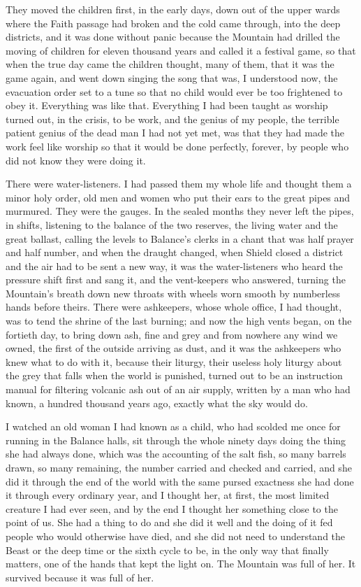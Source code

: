 They moved the children first, in the early days, down out of the upper wards where the Faith passage had broken and the cold came through, into the deep districts, and it was done without panic because the Mountain had drilled the moving of children for eleven thousand years and called it a festival game, so that when the true day came the children thought, many of them, that it was the game again, and went down singing the song that was, I understood now, the evacuation order set to a tune so that no child would ever be too frightened to obey it. Everything was like that. Everything I had been taught as worship turned out, in the crisis, to be work, and the genius of my people, the terrible patient genius of the dead man I had not yet met, was that they had made the work feel like worship so that it would be done perfectly, forever, by people who did not know they were doing it.\par

There were water-listeners. I had passed them my whole life and thought them a minor holy order, old men and women who put their ears to the great pipes and murmured. They were the gauges. In the sealed months they never left the pipes, in shifts, listening to the balance of the two reserves, the living water and the great ballast, calling the levels to Balance's clerks in a chant that was half prayer and half number, and when the draught changed, when Shield closed a district and the air had to be sent a new way, it was the water-listeners who heard the pressure shift first and sang it, and the vent-keepers who answered, turning the Mountain's breath down new throats with wheels worn smooth by numberless hands before theirs. There were ashkeepers, whose whole office, I had thought, was to tend the shrine of the last burning; and now the high vents began, on the fortieth day, to bring down ash, fine and grey and from nowhere any wind we owned, the first of the outside arriving as dust, and it was the ashkeepers who knew what to do with it, because their liturgy, their useless holy liturgy about the grey that falls when the world is punished, turned out to be an instruction manual for filtering volcanic ash out of an air supply, written by a man who had known, a hundred thousand years ago, exactly what the sky would do.\par

I watched an old woman I had known as a child, who had scolded me once for running in the Balance halls, sit through the whole ninety days doing the thing she had always done, which was the accounting of the salt fish, so many barrels drawn, so many remaining, the number carried and checked and carried, and she did it through the end of the world with the same pursed exactness she had done it through every ordinary year, and I thought her, at first, the most limited creature I had ever seen, and by the end I thought her something close to the point of us. She had a thing to do and she did it well and the doing of it fed people who would otherwise have died, and she did not need to understand the Beast or the deep time or the sixth cycle to be, in the only way that finally matters, one of the hands that kept the light on. The Mountain was full of her. It survived because it was full of her.\par


